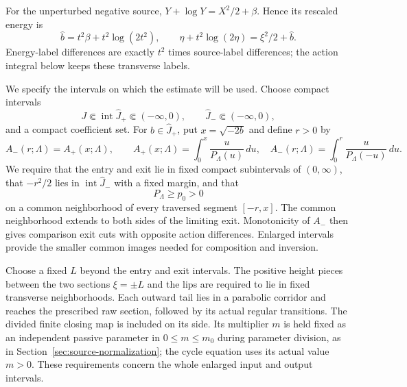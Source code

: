 For the unperturbed negative source,
\(Y+\log Y=X^2/2+\beta\). Hence its rescaled energy is
\begin{equation}\label{neg:affine-energy}
 \widehat b=t^2\beta+t^2\log(2t^2),\qquad
 \eta+t^2\log(2\eta)=\xi^2/2+\widehat b.
\end{equation}
Energy-label differences are exactly \(t^2\) times source-label
differences; the action integral below keeps these transverse labels.

We specify the intervals on which the estimate will be used. Choose
compact intervals
\[
 J\Subset\operatorname{int}\widehat J_+\Subset(-\infty,0),
 \qquad \widehat J_-\Subset(-\infty,0),
\]
and a compact coefficient set. For \(b\in\widehat J_+\), put
\(x=\sqrt{-2b}\) and define \(r>0\) by
\begin{equation}\label{neg:action-equation}
 A_-(r;\Lambda)=A_+(x;\Lambda),\qquad
 A_+(x;\Lambda)=\int_0^x\frac{u}{P_\Lambda(u)}\,du,
 \quad A_-(r;\Lambda)=\int_0^r\frac{u}{P_\Lambda(-u)}\,du.
\end{equation}
We require that the entry and exit lie in fixed compact subintervals
of \((0,\infty)\), that \(-r^2/2\) lies in
\(\operatorname{int}\widehat J_-\) with a fixed margin, and that
\begin{equation}\label{neg:rootfree-margin}
 P_\Lambda\ge p_0>0
\end{equation}
on a common neighborhood of every traversed segment \([-r,x]\).
The common neighborhood extends to both sides of the limiting exit.
Monotonicity of \(A_-\) then gives comparison exit cuts with opposite
action differences. Enlarged intervals provide the smaller common
images needed for composition and inversion.

Choose a fixed \(L\) beyond the entry and exit intervals. The positive
height pieces between the two sections \(\xi=\pm L\) and the lips
are required to lie in fixed transverse neighborhoods. Each outward
tail lies in a parabolic corridor and reaches the prescribed raw
section, followed by its actual regular transitions. The divided
finite closing map is included on its side. Its multiplier \(m\)
is held fixed as an independent passive parameter in
\(0\le m\le m_0\) during parameter division, as in
Section~\ref{sec:source-normalization}; the cycle equation uses its
actual value \(m>0\). These requirements concern the whole enlarged
input and output intervals.

